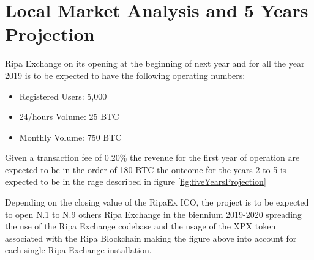 \documentclass[11pt,fleqn,oneside]{book} %
\begin{document}
\section{Local Market Analysis and 5 Years Projection}
Ripa Exchange on its opening at the beginning of next year and for all the year 2019 is to be expected
to have the following operating numbers:
\begin{itemize}
	\item Registered Users: 5,000			%
	\item 24/hours Volume: 25 BTC			%
	\item Monthly Volume: 750 BTC			%
\end{itemize}

Given a transaction fee of 0.20\% the revenue for the first year of operation are expected to be in the order of 180 BTC the 
outcome for the years 2 to 5 is expected to be in the rage described in figure \ref{fig:fiveYearsProjection} 
\begin{center}
	\label{fig:fiveYearsProjection}
\end{center}

Depending on the closing value of the RipaEx ICO, the project is to be expected to open N.1 to N.9 others Ripa Exchange in 
the biennium 2019-2020 spreading the use of the Ripa Exchange codebase and the usage of the XPX token associated with the 
Ripa Blockchain making the figure above into account for each single Ripa Exchange installation.
\end{document}
